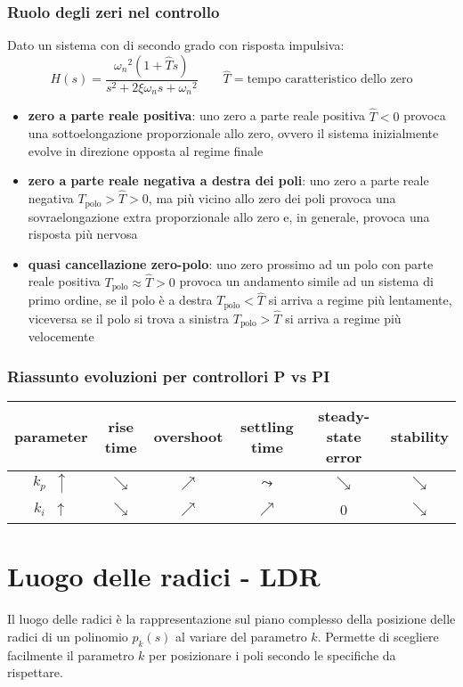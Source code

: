 \subsubsection*{Ruolo degli zeri nel controllo}
Dato un sistema con di secondo grado con risposta impulsiva:
\[H(s) = \frac{{\omega_n}^2(1+\hat{T}s)}{s^2 + 2\xi\omega_ns + {\omega_n}^2} \qquad \hat{T} = \text{tempo caratteristico dello zero}\]
\begin{itemize}
	\item \textbf{zero a parte reale positiva}: uno zero a parte reale positiva \(\hat{T} < 0\) provoca una sottoelongazione
	proporzionale allo zero, ovvero il sistema inizialmente evolve in direzione opposta al regime finale
	\item \textbf{zero a parte reale negativa a destra dei poli}: uno zero a parte reale negativa \(T_\text{polo} > \hat{T} > 0\),
	ma più vicino allo zero dei poli provoca una sovraelongazione extra proporzionale allo zero e, in generale, provoca una
	risposta più nervosa
	\item \textbf{quasi cancellazione zero-polo}: uno zero prossimo ad un polo con parte reale positiva \(T_\text{polo} \approx \hat{T} > 0\)
	provoca un andamento simile ad un sistema di primo ordine, se il polo è a destra \(T_\text{polo} < \hat{T}\) si arriva a
	regime più lentamente, viceversa se il polo si trova a sinistra \(T_\text{polo} > \hat{T}\) si arriva a regime più velocemente
\end{itemize}

\subsubsection*{Riassunto evoluzioni per controllori P vs PI}
\begin{center}
	\begin{tabularx}{\textwidth}{C | C | C | C | C | C}
		\textbf{parameter} & \textbf{rise time} & \textbf{overshoot} & \textbf{settling time} & \textbf{steady-state error} & \textbf{stability} \\
		\toprule
		\(k_p \;\; \uparrow\) & \(\searrow\) & \(\nearrow\) & \(\leadsto\) & \(\searrow\) & \(\searrow\) \\
		\midrule
		\(k_i \;\; \uparrow\) & \(\searrow\) & \(\nearrow\) & \(\nearrow\) & 0 & \(\searrow\)
	\end{tabularx}
\end{center}

\section{Luogo delle radici - LDR}
Il luogo delle radici è la rappresentazione sul piano complesso della posizione delle radici di un polinomio \(p_k(s)\) al variare
del parametro \(k\). Permette di scegliere facilmente il parametro \(k\) per posizionare i poli secondo le specifiche da rispettare.

